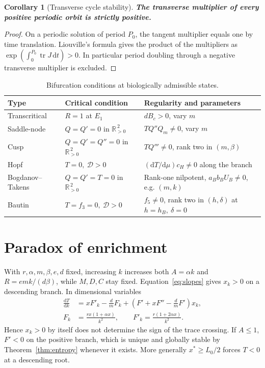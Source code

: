 \documentclass[12pt,a4paper,twoside,fleqn]{article}
\theoremstyle{journal}
\newtheorem{corollary}{Corollary}
\newcommand{\claim}[1]{{\normalfont\bfseries\boldmath #1}}
\newcommand{\dd}{\mathrm{d}}
\newcommand{\tr}{\operatorname{tr}}
\newcommand{\Det}{\mathcal D}
\newcommand{\pos}{\mathbb R_{>0}^{\,2}}
\begin{document}
\begin{corollary}[Transverse cycle stability]
\claim{The transverse multiplier of every positive periodic orbit is strictly positive.}
\end{corollary}
\begin{proof}
On a periodic solution of period \(P_0\), the tangent multiplier equals one by time translation. Liouville's formula gives the product of the multipliers as \(\exp(\int_0^{P_0}\tr J\,\dd t)>0\). In particular period doubling through a negative transverse multiplier is excluded.
\end{proof}
\begin{table}[H]\centering
\caption{Bifurcation conditions at biologically admissible states.}
\label{tab:bif}
\begin{tabularx}{\linewidth}{@{}lYY@{}}\toprule
Type & Critical condition & Regularity and parameters \\ \midrule
Transcritical & \(R=1\) at \(E_1\) & \(dB_c>0\), vary \(m\) \\
Saddle-node & \(Q=Q'=0\) in \(\pos\) & \(TQ''Q_m\ne0\), vary \(m\) \\
Cusp & \(Q=Q'=Q''=0\) in \(\pos\) & \(TQ'''\ne0\), rank two in \((m,\beta)\) \\
Hopf & \(T=0,\ \Det>0\) & \((\dd T/\dd\mu)c_H\ne0\) along the branch \\
Bogdanov--Takens & \(Q=Q'=T=0\) in \(\pos\) & Rank-one nilpotent, \(a_B b_B U_B\ne0\), e.g. \((m,k)\) \\
Bautin & \(T=f_3=0,\ \Det>0\) & \(f_5\ne0\), rank two in \((h,\delta)\) at \(h=h_B,\ \delta=0\) \\
\bottomrule
\end{tabularx}
\end{table}

\section{Paradox of enrichment}\label{sec:enrich}
With \(r,\alpha,m,\beta,e,d\) fixed, increasing \(k\) increases both \(A=\alpha k\) and \(R=emk/(d\beta)\), while \(M,D,C\) stay fixed. Equation~\eqref{eq:slopes} gives \(x_k>0\) on a descending branch. In dimensional variables
\begin{equation}\label{eq:enrich}
 \begin{aligned}
 \frac{\dd T}{\dd k}
   &=x F'_k-\frac{d}{m}F_k+\left(F'+xF''-\frac d m F'\right)x_k,\\
 F_k&=\frac{rx(1+\alpha x)}{k^2},\qquad
 F'_k=\frac{r(1+2\alpha x)}{k^2}.
 \end{aligned}
\end{equation}
Hence \(x_k>0\) by itself does not determine the sign of the trace crossing. If \(A\le1\), \(F'<0\) on the positive branch, which is unique and globally stable by Theorem~\ref{thm:entropy} whenever it exists. More generally \(x^*\ge L_0/2\) forces \(T<0\) at a descending root.
\end{document}
